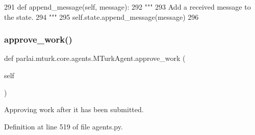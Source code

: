 \begin{DoxyCode}
291     \textcolor{keyword}{def }append\_message(self, message):
292         \textcolor{stringliteral}{"""}
293 \textcolor{stringliteral}{        Add a received message to the state.}
294 \textcolor{stringliteral}{        """}
295         self.state.append\_message(message)
296 
\end{DoxyCode}
\mbox{\label{classparlai_1_1mturk_1_1core_1_1agents_1_1MTurkAgent_a5dad7b198d999ce61833a8b255b5f6d3}} 
\subsubsection{\texorpdfstring{approve\+\_\+work()}{approve\_work()}}
{\footnotesize\ttfamily def parlai.\+mturk.\+core.\+agents.\+M\+Turk\+Agent.\+approve\+\_\+work (\begin{DoxyParamCaption}\item[{}]{self }\end{DoxyParamCaption})}

\begin{DoxyVerb}Approving work after it has been submitted.
\end{DoxyVerb}
 

Definition at line 519 of file agents.\+py.


